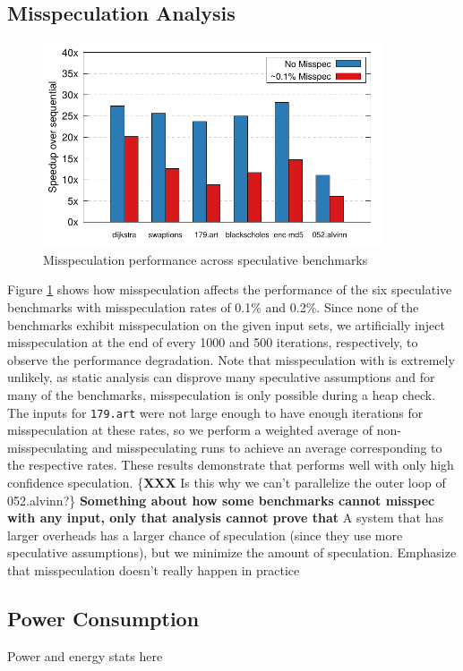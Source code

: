 \subsection{Misspeculation Analysis}
\begin{figure}[htp]
  \includegraphics[width=0.9\textwidth]{figures/misspec}
  \caption{Misspeculation performance across speculative benchmarks}
  \label{fig:misspec}
\end{figure}
Figure \ref{fig:misspec} shows how misspeculation affects the
performance of the six speculative benchmarks with misspeculation rates of
0.1\% and 0.2\%. Since none of the benchmarks exhibit misspeculation on the
given input sets, we artificially inject misspeculation at the end of
every 1000 and 500 iterations, respectively, to observe the performance
degradation. Note that misspeculation with \name is extremely unlikely, as
static analysis can disprove many speculative assumptions and for many of
the benchmarks, misspeculation is only possible during a heap check.
The inputs for \texttt{179.art} were not large enough to have
enough iterations for misspeculation at these rates, so we perform a
weighted average of non-misspeculating and misspeculating runs to achieve
an average corresponding to the respective rates. These results demonstrate
that \name performs well with only high confidence speculation.
\{\textbf{XXX} Is this why we can't parallelize the outer loop of
052.alvinn?\} \textbf{Something about how some benchmarks cannot misspec
with any input, only that analysis cannot prove that} A system that has
larger overheads has a larger chance of speculation (since they use more
speculative assumptions), but we minimize the amount of speculation.
Emphasize that misspeculation doesn't really happen in practice

\subsection{Power Consumption}

Power and energy stats here


